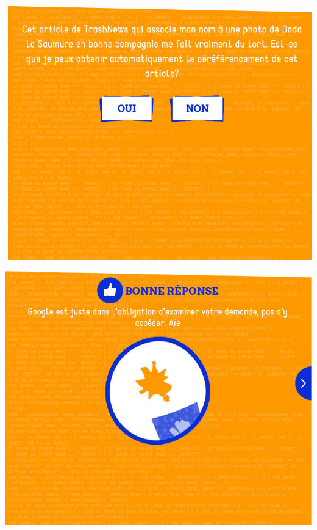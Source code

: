 \documentclass{beamer}
\begin{document}
\begin{frame}\includegraphics[scale=0.6] {./images/Quizz_HygieneNumerique_France4_16.jpg} \end{frame}
\begin{frame}\includegraphics[scale=0.6] {./images/Quizz_HygieneNumerique_France4_17.jpg} \end{frame}
\end{document}
